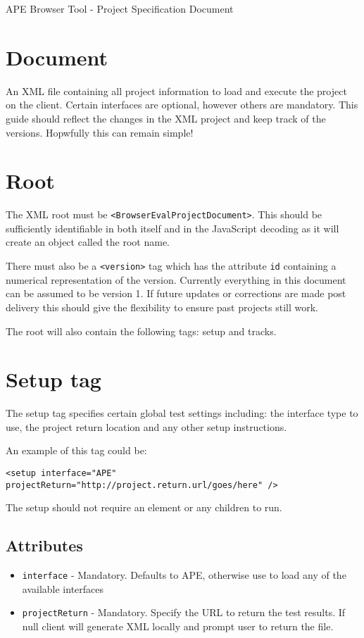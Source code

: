 \documentclass{article}
\begin{document}
\large APE Browser Tool - Project Specification Document

\section{Document}

An XML file containing all project information to load and execute the project on the client. Certain interfaces are optional, however others are mandatory. This guide should reflect the changes in the XML project and keep track of the versions. Hopwfully this can remain simple!

\section{Root}

The XML root must be \texttt{<BrowserEvalProjectDocument>}. This should be sufficiently identifiable in both itself and in the JavaScript decoding as it will create an object called the root name.

There must also be a \texttt{<version>} tag which has the attribute \texttt{id} containing a numerical representation of the version. Currently everything in this document can be assumed to be version 1. If future updates or corrections are made post delivery this should give the flexibility to ensure past projects still work.

The root will also contain the following tags: setup and tracks.

\section{Setup tag}

The setup tag specifies certain global test settings including: the interface type to use, the project return location and any other setup instructions.

An example of this tag could be:

\texttt{<setup interface="APE" projectReturn="http://project.return.url/goes/here" />}

The setup should not require an element or any children to run.

\subsection{Attributes}
\begin{itemize}
\item \texttt{interface} - Mandatory. Defaults to APE, otherwise use to load any of the available interfaces
\item \texttt{projectReturn} - Mandatory. Specify the URL to return the test results. If null client will generate XML locally and prompt user to return the file.
\end{itemize}
\end{document}
